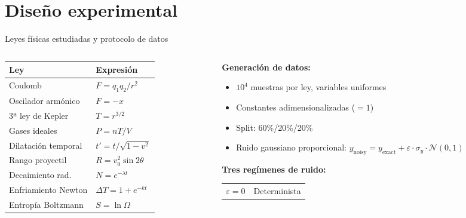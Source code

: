 \documentclass[10pt, aspectratio=169]{beamer}
\begin{document}
\section{Diseño experimental}

\begin{frame}{Leyes físicas estudiadas y protocolo de datos}
  \begin{columns}[T]
    \begin{column}{0.48\textwidth}
      \centering
      \small
      \begin{tabular}{ll}
        \toprule
        \textbf{Ley} & \textbf{Expresión} \\
        \midrule
        Coulomb            & $F = q_1 q_2 / r^2$ \\
        Oscilador armónico & $F = -x$ \\
        3ª ley de Kepler        & $T = r^{3/2}$ \\
        Gases ideales      & $P = nT/V$ \\
        Dilatación temporal& $t' = t/\sqrt{1{-}v^2}$ \\
        Rango proyectil    & $R = v_0^2\sin 2\theta$ \\
        Decaimiento rad.   & $N = e^{-\lambda t}$ \\
        Enfriamiento Newton& $\Delta T = 1+e^{-kt}$ \\
        Entropía Boltzmann & $S = \ln\Omega$ \\
        \bottomrule
      \end{tabular}
    \end{column}
    \begin{column}{0.48\textwidth}
      \textbf{Generación de datos:}
      \begin{itemize}
        \item $10^4$ muestras por ley, variables uniformes
        \item Constantes adimensionalizadas ($= 1$)
        \item Split: 60\%/20\%/20\%
        \item Ruido gaussiano proporcional:
          $y_\text{noisy} = y_\text{exact} + \varepsilon \cdot \sigma_y \cdot \mathcal{N}(0,1)$
      \end{itemize}
      \vspace{0.4em}
      \textbf{Tres regímenes de ruido:}
      \begin{center}
        \begin{tabular}{cl}
          $\varepsilon = 0$ & Determinista \\

\end{tabular}
\end{center}
\end{column}
\end{columns}
\end{frame}
\end{document}
